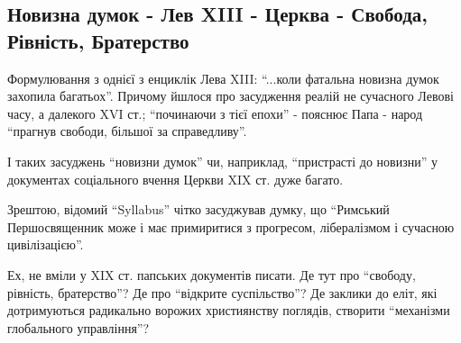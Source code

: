  
 
 
 
 

\subsection{Новизна думок - Лев XIII - Церква - Свобода, Рівність, Братерство}

Формулювання з однієї з енциклік Лева XIII: \enquote{...коли фатальна новизна думок
захопила багатьох}. Причому йшлося про засудження реалій не сучасного Левові
часу, а далекого XVI ст.; \enquote{починаючи з тієї епохи} - пояснює Папа - народ
\enquote{прагнув свободи, більшої за справедливу}. 

І таких засуджень \enquote{новизни думок} чи, наприклад, \enquote{пристрасті до
новизни} у документах соціального вчення Церкви XIX ст. дуже багато.

Зрештою, відомий \enquote{Syllabus} чітко засуджував думку, що 
\enquote{Римський Першосвященник може і має примиритися з прогресом, лібералізмом і сучасною цивілізацією}.

Ех, не вміли у XIX ст. папських документів писати. Де тут про \enquote{свободу,
рівність, братерство}? Де про \enquote{відкрите суспільство}? Де заклики до
еліт, які дотримуються радикально ворожих християнству поглядів, створити
\enquote{механізми глобального управління}?
